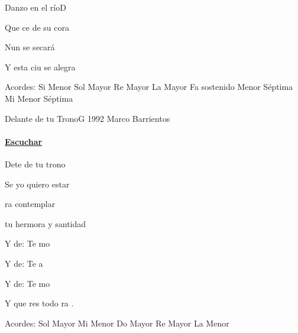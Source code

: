 \documentclass[12pt, spanish]{book}
\begin{document}
\begin{song}{Danzo en el río}{D}
\begin{SBOpGroup}
            Que ce de su cora

            Nun se secará

            Y esta ciu se alegra
        \end{SBOpGroup}

        \ifChordBk
        \begin{SBOpGroup}
            Acordes:\break
            \upchord{\Bm}\qquad Si Menor \hfill
            \upchord{\G}\qquad Sol Mayor \hfill\null\break
            \upchord{\D}\qquad Re Mayor \hfill
            \upchord{\A}\qquad La Mayor \hfill\null\break
            \upchord{\Fsmseven}\qquad Fa sostenido Menor S\'eptima \hfill
            \upchord{\Emseven}\qquad Mi Menor S\'eptima \hfill\null\break
        \end{SBOpGroup}
        \fi
    \end{song}

    \begin{song}{Delante de tu Trono}{G}
    {1992} %
    {Marco Barrientos}
    {} %
    {}
        \ifChordBk
            \paragraph{\mbox{}\hfill\protect\href{https://open.spotify.com/intl-es/track/3A4pZLhpwaA5qww6r1Li33}{Escuchar}\mbox{}\hfill}
        \fi

        \begin{SBOpGroup}
            Dete de tu trono

            Se yo quiero estar

            ra contemplar

            tu hermora y santidad
        \end{SBOpGroup}

        \begin{SBOpGroup}
            Y de: Te mo

            Y de: Te a

            Y de: Te mo

            Y que res todo ra .
        \end{SBOpGroup}

        \ifChordBk
        \begin{SBOpGroup}
            Acordes:
            \upchord{\G}\qquad Sol Mayor \hfill
            \upchord{\Em}\qquad Mi Menor \hfill\null\break
            \upchord{\C}\qquad Do Mayor \hfill
            \upchord{\D}\qquad Re Mayor \hfill\null\break
            \upchord{\Am}\qquad La Menor \hfill
        \end{SBOpGroup}
        \fi
    \end{song}
\end{document}
